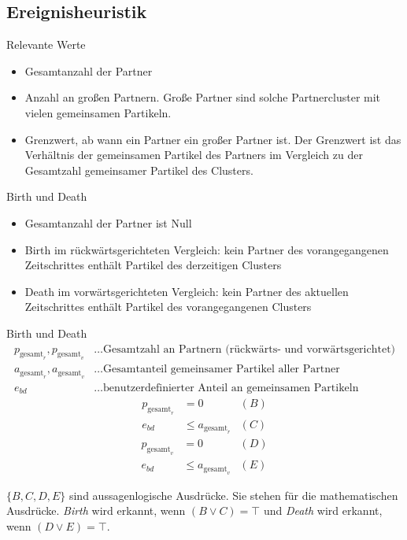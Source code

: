 \documentclass[10pt]{beamer}
\newcommand{\wichtig}[1]{\textit{#1}}
\begin{document}
\subsection{Ereignisheuristik}
\begin{frame}{Relevante Werte}
	\begin{itemize}
		\item Gesamtanzahl der Partner
		\item Anzahl an großen Partnern. Große Partner sind solche Partnercluster mit vielen gemeinsamen Partikeln.
		\item Grenzwert, ab wann ein Partner ein großer Partner ist. Der Grenzwert ist das Verhältnis der gemeinsamen Partikel des Partners im Vergleich zu der Gesamtzahl gemeinsamer Partikel des Clusters.
	\end{itemize}
\end{frame}

\begin{frame}{Birth und Death}
	\begin{itemize}
		\item Gesamtanzahl der Partner ist Null
		\item Birth im rückwärtsgerichteten Vergleich: kein Partner des vorangegangenen Zeitschrittes enthält Partikel des derzeitigen Clusters
		\item Death im vorwärtsgerichteten Vergleich: kein Partner des aktuellen Zeitschrittes enthält Partikel des vorangegangenen Clusters
	\end{itemize}
\end{frame}

\begin{frame}{Birth und Death}
	\begin{align*}
	p_{\text{gesamt}_r}, p_{\text{gesamt}_v} &\ldots \text{Gesamtzahl an Partnern (rückwärts- und vorwärtsgerichtet)}\\
	a_{\text{gesamt}_r}, a_{\text{gesamt}_v} &\ldots \text{Gesamtanteil gemeinsamer Partikel aller Partner}\\
	e_{bd} &\ldots \text{benutzerdefinierter Anteil an gemeinsamen Partikeln}
	\end{align*}
	\begin{equation}
	\begin{aligned}\label{eq:birth}
		p_{\text{gesamt}_r} &= 0 &(B)\\
		e_{bd} &\le a_{\text{gesamt}_r} &(C)
	\end{aligned}
	\end{equation}
	\begin{equation}
	\begin{aligned}\label{eq:death}
		p_{\text{gesamt}_v} &= 0 &(D)\\
		e_{bd} &\le a_{\text{gesamt}_v} &(E)
	\end{aligned}
	\end{equation}
	
	$\{B,C,D,E\}$ sind aussagenlogische Ausdrücke. Sie stehen für die mathematischen Ausdrücke. \wichtig{Birth} wird erkannt, wenn $(B \lor C) = \top$ und \wichtig{Death} wird erkannt, wenn $(D \lor E) = \top$.
\end{frame}
\end{document}
